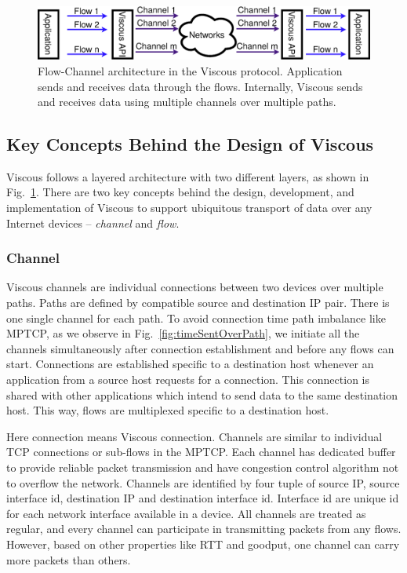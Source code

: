 \begin{figure}[!t]
	\centering
	\includegraphics[width=\linewidth]{img/sys-io}
	\caption{Flow-Channel architecture in the Viscous protocol. Application sends and receives data through the flows. Internally, Viscous sends and receives data using multiple channels over multiple paths.}
	\label{fig:sys-io}
\end{figure}

\subsection{Key Concepts Behind the Design of Viscous}
Viscous follows a layered architecture with two different layers, as shown in Fig.~\ref{fig:sys-io}. There are two key concepts behind the design, development, and implementation of Viscous to support ubiquitous transport of data over any Internet devices -- \textit{channel} and \textit{flow}. 

\subsubsection{Channel}
Viscous channels are individual connections between two devices over multiple paths. Paths are defined by compatible source and destination IP pair. There is one single channel for each path. To avoid connection time path imbalance like MPTCP, as we observe in Fig.~\ref{fig:timeSentOverPath}, we initiate all the channels simultaneously after connection establishment and before any flows can start. Connections are established specific to a destination host whenever an application from a source host requests for a connection. This connection is shared with other applications which intend to send data to the same destination host. This way, flows are multiplexed specific to a destination host.

Here connection means Viscous connection. Channels are similar to individual TCP connections or sub-flows in the MPTCP. Each channel has dedicated buffer to provide reliable packet transmission and have congestion control algorithm not to overflow the network. Channels are identified by four tuple of source IP, source interface id, destination IP and destination interface id. Interface id are unique id for each network interface available in a device. All channels are treated as regular, and every channel can participate in transmitting packets from any flows. However, based on other properties like RTT and goodput, one channel can carry more packets than others.


